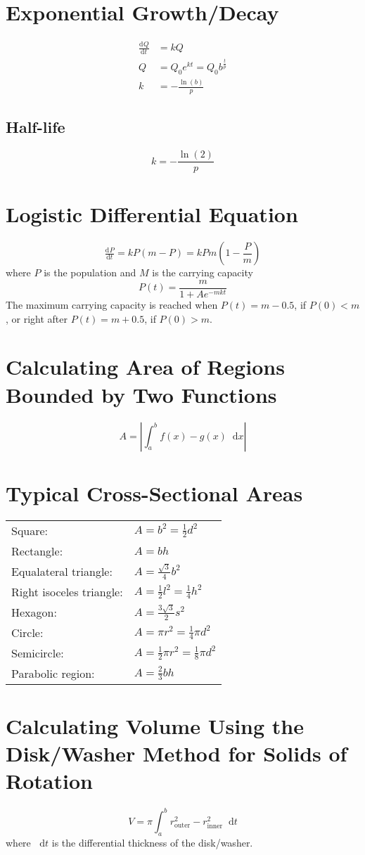 \documentclass[12pt]{article}
\newcommand*{\rmaskip}{\setlength{\abovedisplayskip}{0pt}}
\newcommand*{\rmbskip}{\setlength{\belowdisplayskip}{0pt}}
\newcommand*{\rmskip}{\rmaskip \rmbskip}
\newcommand*{\dd}[3][]{\tfrac{\mathrm{d}^{#1}#2}{\mathrm{d}#3^{#1}}}
\newcommand*{\D}[1]{\mathop{}\!\mathrm{d} #1}
\begin{document}
\section*{Exponential Growth\slash Decay}
{\rmskip\begin{align*}
  \dd{Q}{t} &= kQ\\
  Q &= Q_0 e^{kt} = Q_0 b^{\frac{t}{p}}\\
  k &= -\frac{\ln(b)}{p}
\end{align*}}%
\subsection*{Half-life}
\[
  k = -\frac{\ln(2)}{p}
\]
\section*{Logistic Differential Equation}
\[
  \dd{P}{t} = kP(m - P) = kPm\left(1-\frac{P}{m}\right)
\]
where \(P\) is the population and \(M\) is the carrying capacity
\[
  P(t) = \frac{m}{1 + Ae^{-mkt}}
\]
The maximum carrying capacity is reached when \(P(t) = m - 0.5\), if \(P(0) <
m\), or right after \(P(t) = m + 0.5\), if \(P(0) > m\).
\section*{Calculating Area of Regions Bounded by Two Functions}
\[
  A = \left|\int_a^b f(x) - g(x) \D{x}\right|
\]
\section*{Typical Cross-Sectional Areas}
{\renewcommand{\arraystretch}{1.5}\begin{tabular}{l@{ }l}
  Square: & \(A = b^2 = \frac{1}{2}d^2\)\\
  Rectangle: & \(A = bh\)\\
  Equalateral triangle: & \(A = \frac{\sqrt{3}}{4}b^2\)\\
  Right isoceles triangle: & \(A = \frac{1}{2}l^2 = \frac{1}{4}h^2\)\\
  Hexagon: & \(A = \frac{3\sqrt{3}}{2} s^2\)\\
  Circle: & \(A = \pi r^2 = \frac{1}{4}\pi d^2\)\\
  Semicircle: & \(A = \frac{1}{2}\pi r^2 = \frac{1}{8}\pi d^2\)\\
  Parabolic region: & \(A = \frac{2}{3}bh\)
\end{tabular}}
\section*{Calculating Volume Using the Disk\slash Washer Method for Solids of
Rotation}
\[
  V = \pi\int_a^b r_{\text{outer}}^2 - r_{\text{inner}}^2 \D{t}
\]
where \(\D{t}\) is the differential thickness of the disk\slash washer.
\end{document}
